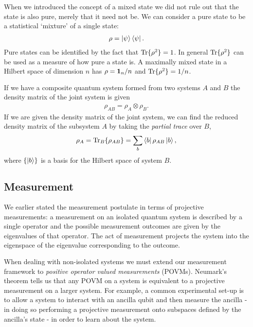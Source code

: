 When we introduced the concept of a mixed state we did not rule out that the state is also pure, merely that it need not be. We can consider a pure state to be a statistical `mixture' of a single state:
\begin{align}
  \rho = \left\vert\psi\right\rangle\left\langle \psi\right\vert.
\end{align}
Pure states can be identified by the fact that $\operatorname{Tr}\{\rho^2\} = 1$. In general $\operatorname{Tr}\{\rho^2\}$ can be used as a measure of how pure a state is. A maximally mixed state in a Hilbert space of dimension $n$ has $\rho = \mathbf{1}_n/n$ and $\operatorname{Tr}\{\rho^2\} = 1/n$.

If we have a composite quantum system formed from two systems $A$ and $B$ the density matrix of the joint system is given
\begin{align}
  \rho_{AB} = \rho_A \otimes \rho_B. 
\end{align}
If we are given the density matrix of the joint system, we can find the reduced density matrix of the subsystem $A$ by taking the \textit{partial trace} over $B$,
\begin{align}
  \rho_A = \operatorname{Tr}_B\{\rho_{AB}\} = \sum_b \left\langle b\right\vert\rho_{AB}\left\vert b\right\rangle,
\end{align}
where $\{\left\vert b\right\rangle\}$ is a basis for the Hilbert space of system $B$. 

\subsection{Measurement}

We earlier stated the measurement postulate in terms of projective measurements: a measurement on an isolated quantum system is described by a single operator and the possible measurement outcomes are given by the eigenvalues of that operator. The act of measurement projects the system into the eigenspace of the eigenvalue corresponding to the outcome. 

When dealing with non-isolated systems we must extend our measurement framework to \textit{positive operator valued measurements} (POVMs). Neumark's theorem \cite{peres} tells us that any POVM on a system is equivalent to a projective measurement on a larger system. For example, a common experimental set-up is to allow a system to interact with an ancilla qubit and then measure the ancilla - in doing so performing a projective measurement onto subspaces defined by the ancilla's state - in order to learn about the system.

